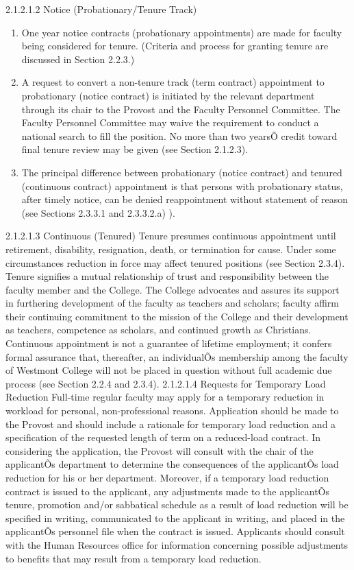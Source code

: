 \documentclass[letterpaper, 11pt]{article}
\begin{document}
				2.1.2.1.2 Notice (Probationary/Tenure Track)
				\begin{enumerate}[label=\alph*)]
					\item{One year notice contracts (probationary appointments) are made for faculty being considered for tenure.  (Criteria and process for granting tenure are discussed in Section 2.2.3.)}
					\item{A request to convert a non-tenure track (term contract) appointment to probationary (notice contract) is initiated by the relevant department through its chair to the Provost and the Faculty Personnel Committee.  The Faculty Personnel Committee may waive the requirement to conduct a national search to fill the position.  No more than two yearsÕ credit toward final tenure review may be given (see Section 2.1.2.3).}
					\item{The principal difference between probationary (notice contract) and tenured (continuous contract) appointment is that persons with probationary status, after timely notice, can be denied reappointment without statement of reason (see Sections 2.3.3.1 and 2.3.3.2.a) ).}
				\end{enumerate}
				2.1.2.1.3 Continuous (Tenured)
				Tenure presumes continuous appointment until retirement, disability, resignation, death, or termination for cause.  Under some circumstances reduction in force may affect tenured positions (see Section 2.3.4).  Tenure signifies a mutual relationship of trust and responsibility between the faculty member and the College.  The College advocates and assures its support in furthering development of the faculty as teachers and scholars; faculty affirm their continuing commitment to the mission of the College and their development as teachers, competence as scholars, and continued growth as Christians. Continuous appointment is not a guarantee of lifetime employment; it confers formal assurance that, thereafter, an individualÕs membership among the faculty of Westmont College will not be placed in question without full academic due process (see Section 2.2.4 and 2.3.4).
				2.1.2.1.4 Requests for Temporary Load Reduction
				Full-time regular faculty may apply for a temporary reduction in workload for personal, non-professional reasons.  Application should be made to the Provost and should include a rationale for temporary load reduction and a specification of the requested length of term on a reduced-load contract.  In considering the application, the Provost will consult with the chair of the applicantÕs department to determine the consequences of the applicantÕs load reduction for his or her department.  Moreover, if a temporary load reduction contract is issued to the applicant, any adjustments made to the applicantÕs tenure, promotion and/or sabbatical schedule as a result of load reduction will be specified in writing, communicated to the applicant in writing, and placed in the applicantÕs personnel file when the contract is issued.  Applicants should consult with the Human Resources office for information concerning possible adjustments to benefits that may result from a temporary load reduction.
\end{document}
